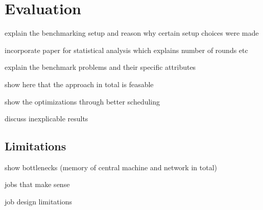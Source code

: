 \chapter{Evaluation}

explain the benchmarking setup and reason why certain setup choices were made

incorporate paper for statistical analysis which explains number of rounds etc

explain the benchmark problems and their specific attributes

show here that the approach in total is feasable

show the optimizations through better scheduling

discuss inexplicable results


\section{Limitations}

show bottlenecks (memory of central machine and network in total)

jobs that make sense

job design limitations
